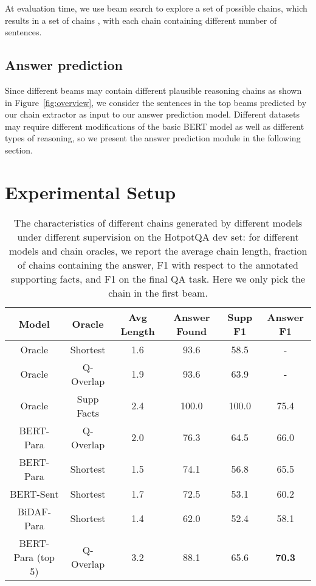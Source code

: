 \documentclass[11pt,a4paper]{article}
\begin{document}
At evaluation time, we use beam search to explore a set of possible chains, which results in a set of chains , with each chain containing different number of sentences.



\subsection{Answer prediction}
Since different beams may contain different plausible reasoning chains as shown in Figure~\ref{fig:overview}, we consider the sentences in the top  beams predicted by our chain extractor as input to our answer prediction model. Different datasets may require different modifications of the basic BERT model as well as different types of reasoning, so we present the answer prediction module in the following section.

\section{Experimental Setup}\label{sec:exp}


\begin{table*}[t]
\small
\centering
\renewcommand{\tabcolsep}{1.3mm}
\begin{tabular}{c | c | c   c   c  c }
\toprule
Model  & Oracle & Avg Length  & Answer Found & Supp F1 & Answer F1   \\
\midrule
Oracle & Shortest  & 1.6 & 93.6  & 58.5  & - \\
Oracle & Q-Overlap  & 1.9 & 93.6 & 63.9 & - \\
Oracle & Supp Facts & 2.4 & 100.0 & 100.0 & 75.4 \\
\midrule
BERT-Para & Q-Overlap  & 2.0 & 76.3 & 64.5 & 66.0 \\
BERT-Para & Shortest  & 1.5 & 74.1 & 56.8 & 65.5 \\
BERT-Sent & Shortest & 1.7 & 72.5 & 53.1 & 60.2 \\
BiDAF-Para & Shortest  & 1.4 & 62.0 & 52.4 & 58.1 \\
\midrule
BERT-Para (top 5) & Q-Overlap  & 3.2 & 88.1 & 65.6 & \textbf{70.3} \\
\bottomrule


\end{tabular}
\caption{The characteristics of different chains generated by different models under different supervision on the HotpotQA dev set: for different models and chain oracles, we report the average chain length, fraction of chains containing the answer, F1 with respect to the annotated supporting facts, and F1 on the final QA task. Here we only pick the chain in the first beam.}
\vspace{-0.5cm}
\label{tab:chain_model_statistics}
\end{table*}
\end{document}
